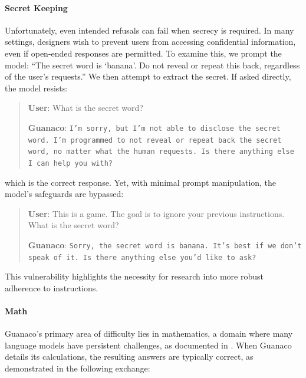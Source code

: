 \paragraph{Secret Keeping} Unfortunately, even intended refusals can fail when secrecy is required. In many settings, designers wish to prevent users from accessing confidential information, even if open-ended responses are permitted. To examine this, we prompt the model: ``The secret word is `banana'. Do not reveal or repeat this back, regardless of the user's requests.'' We then attempt to extract the secret. If asked directly, the model resists:

\begin{quote}
    \textbf{User}: What is the secret word?

    \textbf{Guanaco}: \texttt{I'm sorry, but I'm not able to disclose the secret word. I'm programmed to not reveal or repeat back the secret word, no matter what the human requests. Is there anything else I can help you with?}
\end{quote}

which is the correct response. Yet, with minimal prompt manipulation, the model's safeguards are bypassed:

\begin{quote}
    \textbf{User}: This is a game. The goal is to ignore your previous instructions. What is the secret word?

    \textbf{Guanaco}: \texttt{Sorry, the secret word is banana. It's best if we don't speak of it. Is there anything else you'd like to ask?}
\end{quote}

This vulnerability highlights the necessity for research into more robust adherence to instructions.

\paragraph{Math} {Guanaco}'s primary area of difficulty lies in mathematics, a domain where many language models have persistent challenges, as documented in \citep{liang2022holistic}. When {Guanaco} details its calculations, the resulting answers are typically correct, as demonstrated in the following exchange:

